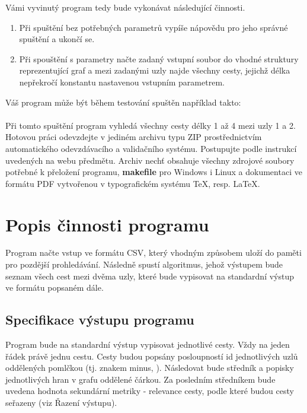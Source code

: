 \documentclass[
12pt,
a4paper,
pdftex,
czech,
titlepage
]{report}
\begin{document}
Vámi vyvinutý program tedy bude vykonávat následující činnosti.
\begin{enumerate}
\item Při spuštění bez potřebných parametrů vypíše nápovědu pro jeho správné spuštění a ukončí se.
\item Při spouštění s parametry načte zadaný vstupní soubor do vhodné struktury reprezentující graf a mezi zadanými uzly najde všechny cesty, jejichž délka nepřekročí konstantu nastavenou vstupním parametrem.
\end{enumerate}

Váš program může být během testování spuštěn například takto:\\

\\

Při tomto spuštění program vyhledá všechny cesty délky 1 až 4 mezi uzly 1 a 2.\\

Hotovou práci odevzdejte v jediném archivu typu ZIP prostřednictvím automatického odevzdávacího a validačního systému. Postupujte podle instrukcí uvedených na webu předmětu. Archiv nechť obsahuje všechny zdrojové soubory potřebné k přeložení programu, \textbf{makefile} pro Windows i Linux a dokumentaci ve formátu PDF vytvořenou v typografickém systému \TeX, resp. \LaTeX.

\section{Popis činnosti programu}
Program načte vstup ve formátu CSV, který vhodným způsobem uloží do paměti pro pozdější prohledávání. Následně spustí algoritmus, jehož výstupem bude seznam všech cest mezi dvěma uzly, které bude vypisovat na standardní výstup ve formátu popsaném dále.

\subsection{Specifikace výstupu programu}
Program bude na standardní výstup vypisovat jednotlivé cesty. Vždy na jeden řádek právě jednu cestu. Cesty budou popsány posloupností id jednotlivých uzlů oddělených pomlčkou (tj. znakem minus,  \uv{\textbf{-}}). Následovat bude středník a popisky jednotlivých hran v grafu oddělené čárkou. Za posledním středníkem bude uvedena hodnota sekundární metriky - relevance cesty, podle které budou cesty seřazeny (viz Řazení výstupu).\\
\end{document}
